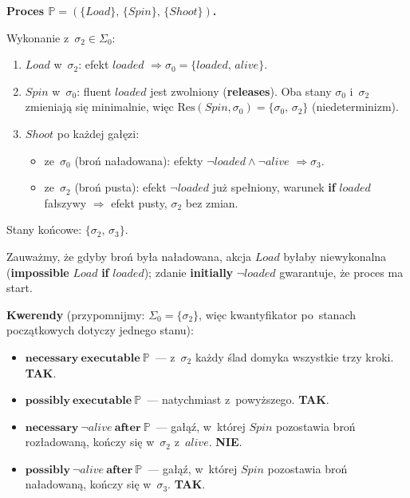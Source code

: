 \documentclass[11pt,a4paper]{article}
\newcommand{\aft}{\textbf{after}}
\renewcommand{\iff}{\textbf{if}}
\newcommand{\initially}{\textbf{initially}}
\newcommand{\impossible}{\textbf{impossible}}
\newcommand{\releases}{\textbf{releases}}
\newcommand{\necessary}{\textbf{necessary}}
\newcommand{\possibly}{\textbf{possibly}}
\newcommand{\executable}{\textbf{executable}}
\theoremstyle{definition}
\begin{document}
\medskip
\noindent\textbf{Proces $\mathbb{P} = (\{\mathit{Load}\},\, \{\mathit{Spin}\},\, \{\mathit{Shoot}\})$.}

\smallskip\noindent
Wykonanie z~$\sigma_2 \in \Sigma_0$:
\begin{enumerate}
  \item $\mathit{Load}$ w~$\sigma_2$: efekt $\mathit{loaded}$
        $\Rightarrow \sigma_0 = \{\mathit{loaded},\,\mathit{alive}\}$.
  \item $\mathit{Spin}$ w~$\sigma_0$: fluent $\mathit{loaded}$ jest zwolniony
        (\releases{}).
        Oba stany $\sigma_0$ i~$\sigma_2$ zmieniają się minimalnie,
        więc $\mathrm{Res}(\mathit{Spin}, \sigma_0) = \{\sigma_0,\, \sigma_2\}$
        (niedeterminizm).
  \item $\mathit{Shoot}$ po każdej gałęzi:
    \begin{itemize}
      \item ze~$\sigma_0$ (broń naładowana):
            efekty $\neg\mathit{loaded} \land \neg\mathit{alive}$
            $\Rightarrow \sigma_3$.
      \item ze~$\sigma_2$ (broń pusta):
            efekt $\neg\mathit{loaded}$ już spełniony,
            warunek \iff{} $\mathit{loaded}$ fałszywy
            $\Rightarrow$ efekt pusty, $\sigma_2$ bez zmian.
    \end{itemize}
\end{enumerate}

Stany końcowe: $\{\sigma_2,\, \sigma_3\}$.

\smallskip\noindent
Zauważmy, że gdyby broń była naładowana, akcja $\mathit{Load}$ byłaby
niewykonalna (\impossible{} $\mathit{Load}$ \iff{} $\mathit{loaded}$);
zdanie \initially{} $\neg\mathit{loaded}$ gwarantuje, że proces ma start.

\medskip
\noindent\textbf{Kwerendy} (przypomnijmy: $\Sigma_0 = \{\sigma_2\}$, więc
kwantyfikator po~stanach początkowych dotyczy jednego stanu):
\begin{itemize}
  \item $\necessary\ \executable\ \mathbb{P}$~---
    z~$\sigma_2$ każdy ślad domyka wszystkie trzy kroki.
    \textbf{TAK}.

  \item $\possibly\ \executable\ \mathbb{P}$~---
    natychmiast z~powyższego. \textbf{TAK}.

  \item $\necessary\ \neg\mathit{alive}\ \aft\ \mathbb{P}$~---
    gałąź, w~której $\mathit{Spin}$ pozostawia broń rozładowaną, kończy się
    w~$\sigma_2$ z~$\mathit{alive}$.
    \textbf{NIE}.

  \item $\possibly\ \neg\mathit{alive}\ \aft\ \mathbb{P}$~---
    gałąź, w~której $\mathit{Spin}$ pozostawia broń naładowaną, kończy się
    w~$\sigma_3$.
    \textbf{TAK}.
\end{itemize}
\end{document}

